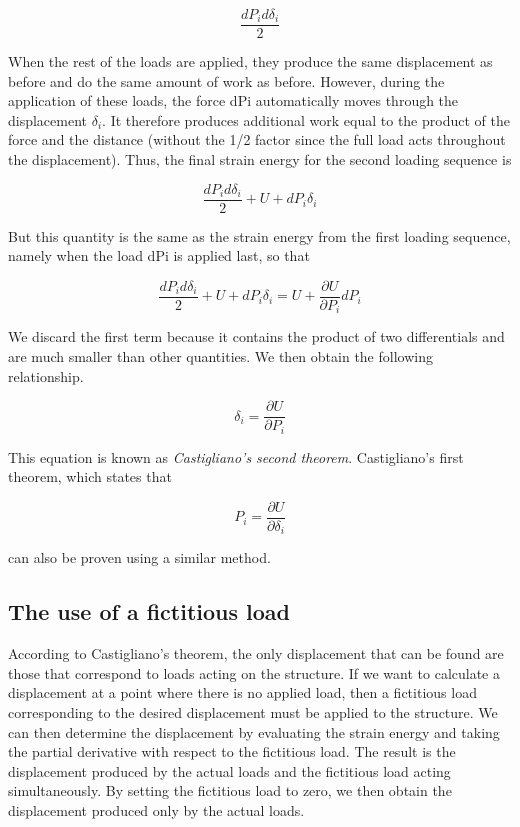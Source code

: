 \documentclass[
10pt,
a4paper,
openany,
svgnames,
]{book} %
\begin{document}
\[\frac{dP_i d\delta _i}{2}\]

When the rest of the loads are applied, they produce the same displacement as before and do the same amount of work as before. However, during the application of these loads, the force dPi automatically moves through the displacement $\delta_i$. It therefore produces additional work equal to the product of the force and the distance (without the 1/2 factor since the full load acts throughout the displacement). Thus, the final strain energy for the second loading sequence is

\[\frac{dP_i d\delta _i}{2} + U + dP_i\delta _i\]

But this quantity is the same as the strain energy from the first loading sequence, namely when the load dPi is applied last, so that

\[\frac{dP_id\delta _i}{2} + U + dP_i\delta _i = U + \frac{\partial U}{\partial P_i}dP_i\]

We discard the first term because it contains the product of two differentials and are much smaller than other quantities. We then obtain the following relationship.

\begin{equation}
  \delta_i = \frac{\partial U}{\partial P_i}
\end{equation}

This equation is known as \emph{Castigliano’s second theorem}.
Castigliano’s first theorem, which states that

\[P_i = \frac{\partial U}{\partial \delta_i}\]

can also be proven using a similar method.

\subsection{The use of a fictitious load}

According to Castigliano’s theorem, the only displacement that can be found are those that correspond to loads acting on the structure. If we want to calculate a displacement at a point where there is no applied load, then a fictitious load corresponding to the desired displacement must be applied to the structure. We can then determine the displacement by evaluating the strain energy and taking the partial derivative with respect to the fictitious load. The result is the displacement produced by the actual loads and the fictitious load acting simultaneously. By setting the fictitious load to zero, we then obtain the displacement produced only by the actual loads.
\end{document}
